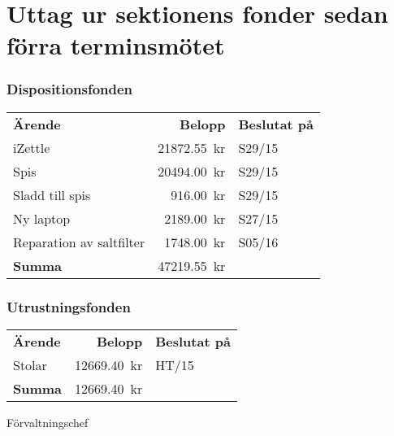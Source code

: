 \documentclass[../_main/handlingar.tex]{subfiles}
\begin{document}
\section{Uttag ur sektionens fonder sedan förra terminsmötet}

\subsubsection*{Dispositionsfonden}
\begin{tabular}{l r l}
    \textbf{Ärende} & \textbf{Belopp} & \textbf{Beslutat på} \\
    iZettle & \SI{21872.55}{kr} & S29/15 \\
    Spis & \SI{20494.00}{kr} & S29/15 \\
    Sladd till spis & \SI{916.00}{kr} & S29/15 \\
    Ny laptop & \SI{2189.00}{kr} & S27/15 \\
    Reparation av saltfilter & \SI{1748.00}{kr} & S05/16 \\
    \hline
    \textbf{Summa} & \SI{47219.55}{kr} \\
\end{tabular}

\subsubsection*{Utrustningsfonden}
\begin{tabular}{l r l}
    \textbf{Ärende} & \textbf{Belopp} & \textbf{Beslutat på} \\
    Stolar & \SI{12669.40}{kr} & HT/15 \\
    \hline
    \textbf{Summa} & \SI{12669.40}{kr} \\
\end{tabular}

\begin{signatures}{1}
    \ist
    \signature{Anders Nilsson}{Förvaltningschef}
\end{signatures}
\end{document}
